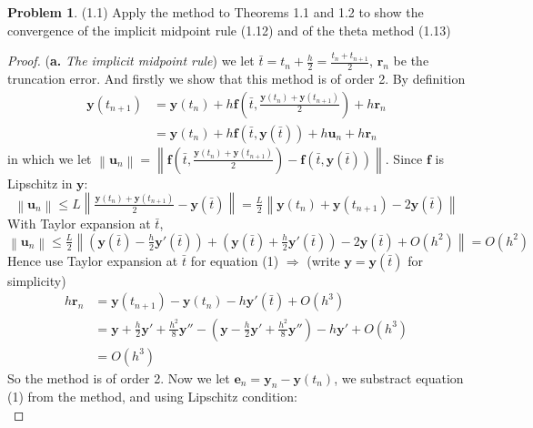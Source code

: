 \documentclass[a4paper, 10pt]{article}
\theoremstyle{definition}
\newtheorem{problem}{Problem}
\theoremstyle{hSol}
\begin{document}
\begin{problem} (1.1) Apply the method to Theorems 1.1 and 1.2 to show the convergence of the implicit midpoint rule (1.12) and of the theta method (1.13)
\end{problem}
\begin{proof} (\textbf{a.} \emph{The implicit midpoint rule}) we let $\bar{t}=t_n+\frac{h}{2}=\frac{t_n+t_{n+1}}{2}$, $\bm{r}_n$ be the truncation error. And firstly we show that this method is of order 2. By definition
\begin{equation}
  \begin{split}
      \bm{y}(t_{n+1}) &= \bm{y}(t_n) + h \bm{f}(\bar{t}, \tfrac{\bm{y}(t_n)+\bm{y}(t_{n+1})}{2}) + h \bm{r}_n \\
      &= \bm{y}(t_n) + h \bm{f}(\bar{t}, \bm{y}(\bar{t})) + h \bm{u}_n + h \bm{r}_n 
  \end{split}
\end{equation}
in which we let $\left\|\bm{u}_n\right\|= \left\|\bm{f}(\bar{t}, \tfrac{\bm{y}(t_n)+\bm{y}(t_{n+1})}{2})- \bm{f}(\bar{t}, \bm{y}(\bar{t}))\right\|$. Since $\bm{f}$ is Lipschitz in $\bm{y}$:
\begin{equation}
  \left\|\bm{u}_n\right\| \leq L \left\|\tfrac{\bm{y}(t_n)+\bm{y}(t_{n+1})}{2}-\bm{y}(\bar{t})\right\| = \tfrac{L}{2} \left\|\bm{y}(t_n)+\bm{y}(t_{n+1})-2 \bm{y}(\bar{t})\right\|
\end{equation}
With Taylor expansion at $\bar{t}$,
\begin{equation}
  \left\|\bm{u}_n\right\| \leq \tfrac{L}{2} \left\|(\bm{y}(\bar{t})-\tfrac{h}{2}\bm{y}'(\bar{t}))+(\bm{y}(\bar{t})+\tfrac{h}{2}\bm{y}'(\bar{t}))-2 \bm{y}(\bar{t})+O(h^2)\right\| = O(h^2)
\end{equation}
Hence use Taylor expansion at $\bar{t}$ for equation (1) $\Rightarrow$ (write $\bm{y}=\bm{y}(\bar{t})$ for simplicity)
\begin{equation}
  \begin{split}
    h \bm{r}_n &= \bm{y}(t_{n+1}) - \bm{y}(t_n) - h \bm{y}'(\bar{t}) + O(h^3) \\
    &= \bm{y} + \tfrac{h}{2}\bm{y}' + \tfrac{h^2}{8}\bm{y}'' - (\bm{y}-\tfrac{h}{2}\bm{y}' + \tfrac{h^2}{8}\bm{y}'') - h \bm{y}' + O(h^3)  \\
    &= O(h^3)
  \end{split}
\end{equation}
So the method is of order 2. Now we let $\bm{e}_n = \bm{y}_n - \bm{y}(t_n)$, we substract equation (1) from the method, and using Lipschitz condition:
\begin{equation}

\end{equation}
\end{proof}
\end{document}
